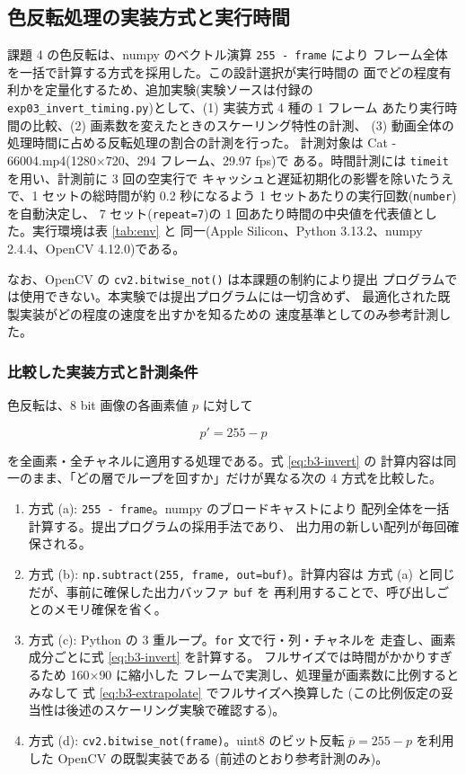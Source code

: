 \subsection{色反転処理の実装方式と実行時間}

課題 4 の色反転は、numpy のベクトル演算 {\tt 255 - frame} により
フレーム全体を一括で計算する方式を採用した。この設計選択が実行時間の
面でどの程度有利かを定量化するため、追加実験(実験ソースは付録の
{\tt exp03\_invert\_timing.py})として、(1) 実装方式 4 種の 1 フレーム
あたり実行時間の比較、(2) 画素数を変えたときのスケーリング特性の計測、
(3) 動画全体の処理時間に占める反転処理の割合の計測を行った。
計測対象は Cat - 66004.mp4(1280$\times$720、294 フレーム、29.97 fps)で
ある。時間計測には {\tt timeit} を用い、計測前に 3 回の空実行で
キャッシュと遅延初期化の影響を除いたうえで、1 セットの総時間が約
0.2 秒になるよう 1 セットあたりの実行回数({\tt number})を自動決定し、
7 セット({\tt repeat=7})の 1 回あたり時間の中央値を代表値とした。実行環境は表 \ref{tab:env} と
同一(Apple Silicon、Python 3.13.2、numpy 2.4.4、OpenCV 4.12.0)である。

なお、OpenCV の {\tt cv2.bitwise\_not()} は本課題の制約により提出
プログラムでは使用できない。本実験では提出プログラムには一切含めず、
最適化された既製実装がどの程度の速度を出すかを知るための
速度基準としてのみ参考計測した。

\subsubsection{比較した実装方式と計測条件}

色反転は、8 bit 画像の各画素値 $p$ に対して

\begin{equation}\label{eq:b3-invert}
p' = 255 - p
\end{equation}

を全画素・全チャネルに適用する処理である。式 \ref{eq:b3-invert} の
計算内容は同一のまま、「どの層でループを回すか」だけが異なる次の
4 方式を比較した。

\begin{enumerate}
\item 方式 (a): {\tt 255 - frame}。numpy のブロードキャストにより
      配列全体を一括計算する。提出プログラムの採用手法であり、
      出力用の新しい配列が毎回確保される。
\item 方式 (b): {\tt np.subtract(255, frame, out=buf)}。計算内容は
      方式 (a) と同じだが、事前に確保した出力バッファ {\tt buf} を
      再利用することで、呼び出しごとのメモリ確保を省く。
\item 方式 (c): Python の 3 重ループ。{\tt for} 文で行・列・チャネルを
      走査し、画素成分ごとに式 \ref{eq:b3-invert} を計算する。
      フルサイズでは時間がかかりすぎるため 160$\times$90 に縮小した
      フレームで実測し、処理量が画素数に比例するとみなして
      式 \ref{eq:b3-extrapolate} でフルサイズへ換算した
      (この比例仮定の妥当性は後述のスケーリング実験で確認する)。
\item 方式 (d): {\tt cv2.bitwise\_not(frame)}。uint8 のビット反転
      $\overline{p}=255-p$ を利用した OpenCV の既製実装である
      (前述のとおり参考計測のみ)。
\end{enumerate}

